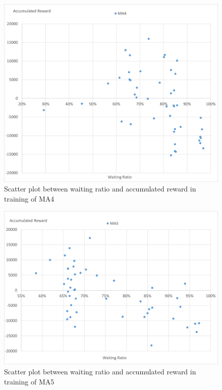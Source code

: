 \begin{figure}[htbp]
  \centering
  \includegraphics[scale=0.5]{./Figure/ma4waitingReward.png}
  \caption{Scatter plot between waiting ratio and accumulated reward in training of MA4}
  \label{fig:ma4waitingReward}
\end{figure}

\begin{figure}[htbp]
  \centering
  \includegraphics[scale=0.5]{./Figure/ma5waitingReward.png}
  \caption{Scatter plot between waiting ratio and accumulated reward in training of MA5}
  \label{fig:ma5waitingReward}
\end{figure}

